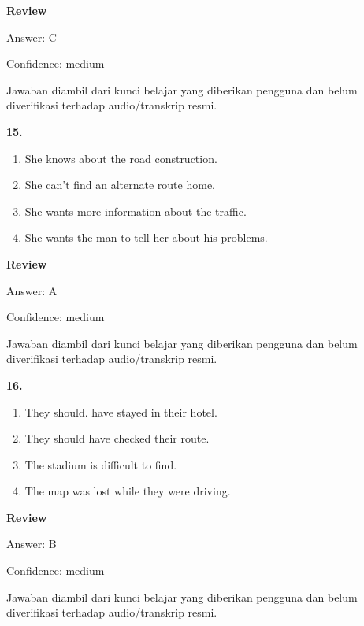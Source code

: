 \documentclass[12pt]{article}
\begin{document}
\par
\begingroup
\setlength{\parskip}{0pt}
\setlength{\parindent}{0pt}
\textbf{Review}\par
Answer: C\par
Confidence: medium\par
Jawaban diambil dari kunci belajar yang diberikan pengguna dan belum diverifikasi terhadap audio/transkrip resmi.\par
\endgroup
\par
\vspace{0.25\baselineskip}
\noindent\textbf{15.}
\begin{enumerate}[label=(\Alph*),leftmargin=*,itemsep=0.2em]
\item She knows about the road construction.
\item She can't find an alternate route home.
\item She wants more information about the traffic.
\item She wants the man to tell her about his problems.
\end{enumerate}
\par
\begingroup
\setlength{\parskip}{0pt}
\setlength{\parindent}{0pt}
\textbf{Review}\par
Answer: A\par
Confidence: medium\par
Jawaban diambil dari kunci belajar yang diberikan pengguna dan belum diverifikasi terhadap audio/transkrip resmi.\par
\endgroup
\par
\vspace{0.25\baselineskip}
\noindent\textbf{16.}
\begin{enumerate}[label=(\Alph*),leftmargin=*,itemsep=0.2em]
\item They should. have stayed in their hotel.
\item They should have checked their route.
\item The stadium is difficult to find.
\item The map was lost while they were driving.
\end{enumerate}
\par
\begingroup
\setlength{\parskip}{0pt}
\setlength{\parindent}{0pt}
\textbf{Review}\par
Answer: B\par
Confidence: medium\par
Jawaban diambil dari kunci belajar yang diberikan pengguna dan belum diverifikasi terhadap audio/transkrip resmi.\par
\end{document}
